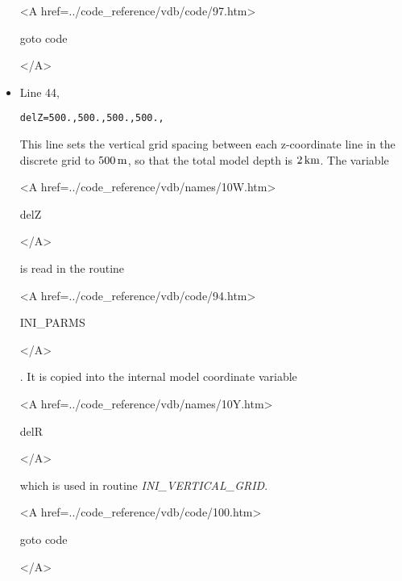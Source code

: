 \begin{itemize}
{\bf
\begin{rawhtml} <A href=../code_reference/vdb/code/97.htm> \end{rawhtml}
goto code
\begin{rawhtml} </A>\end{rawhtml}
}

\item Line 44,
\begin{verbatim}
delZ=500.,500.,500.,500.,
\end{verbatim}
This line sets the vertical grid spacing between each z-coordinate line
in the discrete grid to $500\,{\rm m}$, so that the total model depth 
is $2\,{\rm km}$.
The variable
{\bf
\begin{rawhtml} <A href=../code_reference/vdb/names/10W.htm> \end{rawhtml}
delZ
\begin{rawhtml} </A>\end{rawhtml}
}
is read in the routine
{\it
\begin{rawhtml} <A href=../code_reference/vdb/code/94.htm> \end{rawhtml}
INI\_PARMS
\begin{rawhtml} </A>\end{rawhtml}
}.
It is copied into the internal
model coordinate variable 
{\bf 
\begin{rawhtml} <A href=../code_reference/vdb/names/10Y.htm> \end{rawhtml}
delR
\begin{rawhtml} </A>\end{rawhtml}
} which is used in routine {\it INI\_VERTICAL\_GRID}.

{\bf
\begin{rawhtml} <A href=../code_reference/vdb/code/100.htm> \end{rawhtml}
goto code
\begin{rawhtml} </A>\end{rawhtml}
}


\end{itemize}

